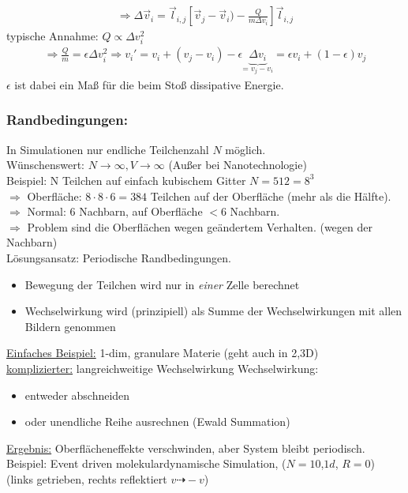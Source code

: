\documentclass[12pt]{article}
\begin{document}
\begin{align}
\Rightarrow \Delta \vec{v}_i = \vec{l}_{i,j} \left[ \vec{v}_j - \vec{v}_i) - \frac{Q}{m \Delta v_i} \right] \vec{l}_{i,j}
\end{align}
typische Annahme: $Q \propto \Delta v_i^2$ 
\begin{align}
\Rightarrow \frac{Q}{m}= \epsilon \Delta v_i^2 \Rightarrow v_i ' = v_i + (v_j - v_i) - \epsilon\underbrace{ \Delta v_i}_\text{= $v_j -v_i$} = \epsilon v_i + (1-\epsilon) v_j
\end{align}
$\epsilon$ ist dabei ein Maß für die beim Stoß dissipative Energie.
\subsubsection*{Randbedingungen:}
In Simulationen nur endliche Teilchenzahl $N$ möglich. \\
Wünschenswert: $N \to \infty, V \to \infty$ (Außer bei Nanotechnologie) \\
Beispiel:  N Teilchen auf einfach kubischem Gitter $N = 512 = 8^3$ \\
$\Rightarrow$ Oberfläche: $8 \cdot 8 \cdot 6 = 384$ Teilchen auf der Oberfläche (mehr als die Hälfte). \\
$\Rightarrow$ Normal: $6$ Nachbarn, auf Oberfläche $<6$ Nachbarn. \\
$\Rightarrow$ Problem sind die Oberflächen wegen geändertem Verhalten. (wegen der Nachbarn)\\
Lösungsansatz: Periodische Randbedingungen. 
\begin{itemize}
\item Bewegung der Teilchen wird nur in \textit{einer} Zelle berechnet
\item Wechselwirkung wird (prinzipiell) als Summe der Wechselwirkungen mit allen Bildern genommen
\end{itemize}
\underline{Einfaches Beispiel:} 1-dim, granulare Materie (geht auch in 2,3D) \\
\underline{komplizierter:} langreichweitige Wechselwirkung
Wechselwirkung:
\begin{itemize}
\item entweder abschneiden
\item oder unendliche Reihe ausrechnen (Ewald Summation)
\end{itemize}
\underline{Ergebnis:} Oberflächeneffekte verschwinden, aber System bleibt periodisch. \\
Beispiel: Event driven molekulardynamische Simulation, ($N=10$,$1d$, $R=0$) (links getrieben, rechts reflektiert $v  \dashrightarrow -v$)
\end{document}
